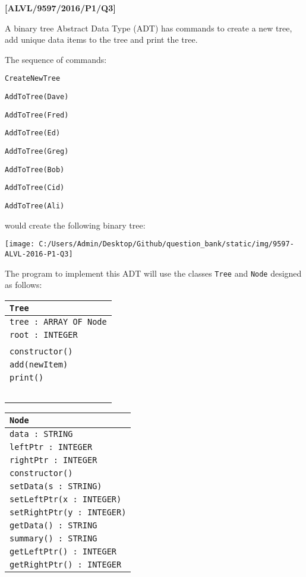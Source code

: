\item \textbf{{[}ALVL/9597/2016/P1/Q3{]} }

A binary tree Abstract Data Type (ADT) has commands to create a new
tree, add unique data items to the tree and print the tree.

The sequence of commands: 

\noindent %
\noindent\begin{minipage}[t]{1\columnwidth}%
\texttt{CreateNewTree }

\texttt{AddToTree(\textquotedbl Dave\textquotedbl ) }

\texttt{AddToTree(\textquotedbl Fred\textquotedbl ) }

\texttt{AddToTree(\textquotedbl Ed\textquotedbl ) }

\texttt{AddToTree(\textquotedbl Greg\textquotedbl ) }

\texttt{AddToTree(\textquotedbl Bob\textquotedbl ) }

\texttt{AddToTree(\textquotedbl Cid\textquotedbl ) }

\texttt{AddToTree(\textquotedbl Ali\textquotedbl )}%
\end{minipage}

would create the following binary tree:
\begin{center}
\texttt{[image: C:/Users/Admin/Desktop/Github/question\_bank/static/img/9597-ALVL-2016-P1-Q3]}
\par\end{center}

The program to implement this ADT will use the classes \texttt{Tree}
and \texttt{Node} designed as follows:
\begin{center}
\begin{tabular}{|l|}
\hline 
\texttt{\hspace{0.25\columnwidth}Tree}\tabularnewline
\hline 
\texttt{tree : ARRAY OF Node}\tabularnewline
\texttt{root : INTEGER}\tabularnewline
\tabularnewline
\hline 
\texttt{constructor()}\tabularnewline
\texttt{add(newItem)}\tabularnewline
\texttt{print() }\tabularnewline
\tabularnewline
\tabularnewline
\tabularnewline
\tabularnewline
\tabularnewline
\hline 
\end{tabular}%
\begin{tabular}{|l|}
\hline 
\hspace{0.25\columnwidth}\texttt{Node}\tabularnewline
\hline 
\texttt{data : STRING}\tabularnewline
\texttt{leftPtr : INTEGER}\tabularnewline
\texttt{rightPtr : INTEGER}\tabularnewline
\hline 
\texttt{constructor()}\tabularnewline
\texttt{setData(s : STRING)}\tabularnewline
\texttt{setLeftPtr(x : INTEGER)}\tabularnewline
\texttt{setRightPtr(y : INTEGER)}\tabularnewline
\texttt{getData() : STRING}\tabularnewline
\texttt{summary() : STRING}\tabularnewline
\texttt{getLeftPtr() : INTEGER}\tabularnewline
\texttt{getRightPtr() : INTEGER}\tabularnewline
\hline 
\end{tabular}
\par\end{center}

